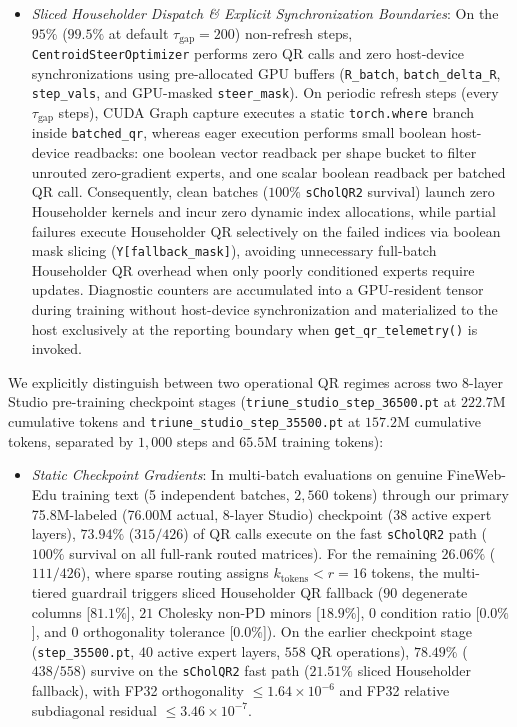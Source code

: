 \documentclass[10pt,twocolumn,letterpaper]{article}
\begin{document}
\begin{enumerate}
\begin{itemize}
        \item \emph{Sliced Householder Dispatch \& Explicit Synchronization Boundaries}: On the $95\%$ ($99.5\%$ at default $\tau_{\text{gap}} = 200$) non-refresh steps, \texttt{CentroidSteerOptimizer} performs zero QR calls and zero host-device synchronizations using pre-allocated GPU buffers (\texttt{R\_batch}, \texttt{batch\_delta\_R}, \texttt{step\_vals}, and GPU-masked \texttt{steer\_mask}). On periodic refresh steps (every $\tau_{\text{gap}}$ steps), CUDA Graph capture executes a static \texttt{torch.where} branch inside \texttt{batched\_qr}, whereas eager execution performs small boolean host-device readbacks: one boolean vector readback per shape bucket to filter unrouted zero-gradient experts, and one scalar boolean readback per batched QR call. Consequently, clean batches ($100\%$ \texttt{sCholQR2} survival) launch zero Householder kernels and incur zero dynamic index allocations, while partial failures execute Householder QR selectively on the failed indices via boolean mask slicing (\texttt{Y[fallback\_mask]}), avoiding unnecessary full-batch Householder QR overhead when only poorly conditioned experts require updates. Diagnostic counters are accumulated into a GPU-resident tensor during training without host-device synchronization and materialized to the host exclusively at the reporting boundary when \texttt{get\_qr\_telemetry()} is invoked.
    \end{itemize}
    We explicitly distinguish between two operational QR regimes across two 8-layer Studio pre-training checkpoint stages (\texttt{triune\_studio\_step\_36500.pt} at $222.7\text{M}$ cumulative tokens and \texttt{triune\_studio\_step\_35500.pt} at $157.2\text{M}$ cumulative tokens, separated by $1,000$ steps and $65.5\text{M}$ training tokens):
    \begin{itemize}
        \item \emph{Static Checkpoint Gradients}: In multi-batch evaluations on genuine FineWeb-Edu training text (5 independent batches, $2,560$ tokens) through our primary 75.8M-labeled (76.00M actual, 8-layer Studio) checkpoint ($38$ active expert layers), $\mathbf{73.94\%}$ ($315 / 426$) of QR calls execute on the fast \texttt{sCholQR2} path ($100\%$ survival on all full-rank routed matrices). For the remaining $26.06\%$ ($111 / 426$), where sparse routing assigns $k_{\text{tokens}} < r=16$ tokens, the multi-tiered guardrail triggers sliced Householder QR fallback ($90$ degenerate columns [$81.1\%$], $21$ Cholesky non-PD minors [$18.9\%$], $0$ condition ratio [$0.0\%$], and $0$ orthogonality tolerance [$0.0\%$]). On the earlier checkpoint stage (\texttt{step\_35500.pt}, $40$ active expert layers, $558$ QR operations), $\mathbf{78.49\%}$ ($438 / 558$) survive on the \texttt{sCholQR2} fast path ($21.51\%$ sliced Householder fallback), with FP32 orthogonality $\le 1.64 \times 10^{-6}$ and FP32 relative subdiagonal residual $\le 3.46 \times 10^{-7}$.

\end{itemize}
\end{enumerate}
\end{document}
